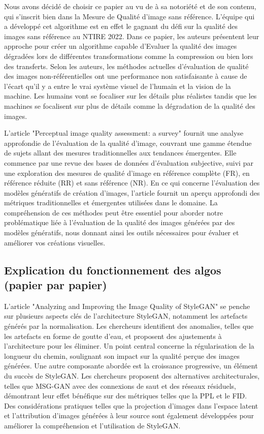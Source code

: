 \documentclass{ieeeaccess}
\begin{document}
 Nous avons décidé de choisir ce papier au vu de à sa notoriété et de son contenu, qui s’inscrit bien dans la Mesure de Qualité d’image sans référence. L’équipe qui a développé cet algorithme est en effet le gagnant du défi sur la qualité des images sans référence au NTIRE 2022. Dans ce papier, les auteurs présentent leur approche pour créer un algorithme capable d’Evaluer la qualité des images dégradées lors de différentes transformations comme la compression ou bien lors des transferts. Selon les auteurs, les méthodes actuelles d’évaluation de qualité des images non-référentielles ont une performance non satisfaisante à cause de l’écart qu’il y a entre le vrai système visuel de l’humain et la vision de la machine. Les humains vont se focaliser sur les détails plus réalistes tandis que les machines se focalisent sur plus de détails comme la dégradation de la qualité des images.  

 L'article "Perceptual image quality assessment: a survey" fournit une analyse approfondie de l'évaluation de la qualité d'image, couvrant une gamme étendue de sujets allant des mesures traditionnelles aux tendances émergentes. Elle commence par une revue des bases de données d'évaluation subjective, suivi par une exploration des mesures de qualité d'image en référence complète (FR), en référence réduite (RR) et sans référence (NR). En ce qui concerne l'évaluation des modèles génératifs de création d'images, l'article fournit un aperçu approfondi des métriques traditionnelles et émergentes utilisées dans le domaine. La compréhension de ces méthodes peut être essentiel pour aborder notre problématique liée à l'évaluation de la qualité des images générées par des modèles génératifs, nous donnant ainsi les outils nécessaires pour évaluer et améliorer vos créations visuelles. 

\subsection{Explication du fonctionnement des algos (papier par papier)}

 L'article "Analyzing and Improving the Image Quality of StyleGAN" se penche sur plusieurs aspects clés de l'architecture StyleGAN, notamment les artefacts générés par la normalisation. Les chercheurs identifient des anomalies, telles que les artefacts en forme de goutte d'eau, et proposent des ajustements à l'architecture pour les éliminer. Un point central concerne la régularisation de la longueur du chemin, soulignant son impact sur la qualité perçue des images générées. Une autre composante abordée est la croissance progressive, un élément du succès de StyleGAN. Les chercheurs proposent des alternatives architecturales, telles que MSG-GAN avec des connexions de saut et des réseaux résiduels, démontrant leur effet bénéfique sur des métriques telles que la PPL et le FID. Des considérations pratiques telles que la projection d'images dans l'espace latent et l'attribution d'images générées à leur source sont également développées pour améliorer la compréhension et l'utilisation de StyleGAN.
\end{document}
